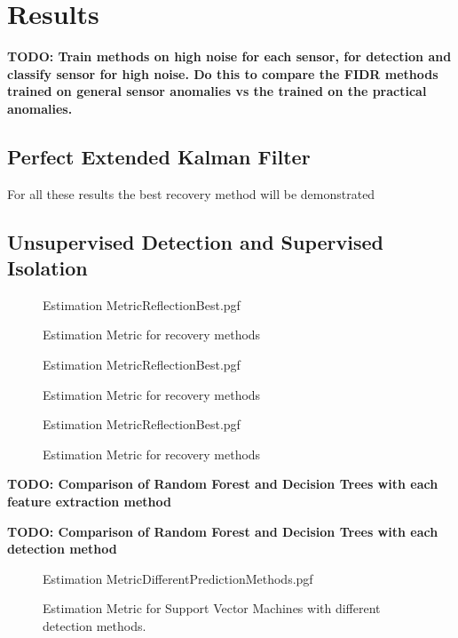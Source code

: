 \chapter{Results}
\label{chap:Results}

\textbf{TODO: Train methods on high noise for each sensor, for detection and classify sensor for high noise. Do this to compare the FIDR methods trained on general sensor anomalies vs the trained on the practical anomalies.}

\section{Perfect Extended Kalman Filter}
For all these results the best recovery method will be demonstrated

\section{Unsupervised Detection and Supervised Isolation}
\begin{figure}[!htb]
	\centering
	{Estimation MetricReflectionBest.pgf}
	
	\caption{Estimation Metric for recovery methods}
	\label{fig:RecoveryComparisonMagnetic}
\end{figure}

\begin{figure}[!htb]
	\centering
	{Estimation MetricReflectionBest.pgf}
	
	\caption{Estimation Metric for recovery methods}
	\label{fig:RecoveryComparisonMagnetic}
\end{figure}

\begin{figure}[!htb]
	\centering
	{Estimation MetricReflectionBest.pgf}
	
	\caption{Estimation Metric for recovery methods}
	\label{fig:RecoveryComparisonMagnetic}
\end{figure}

\textbf{TODO: Comparison of Random Forest and Decision Trees with each feature extraction method}

\textbf{TODO: Comparison of Random Forest and Decision Trees with each detection method}

\begin{figure}[!htb]
	\centering
	{Estimation MetricDifferentPredictionMethods.pgf}
	
	\caption{Estimation Metric for Support Vector Machines with different detection methods.}
	\label{fig:SVMCompareDetectionMethods}
\end{figure}

